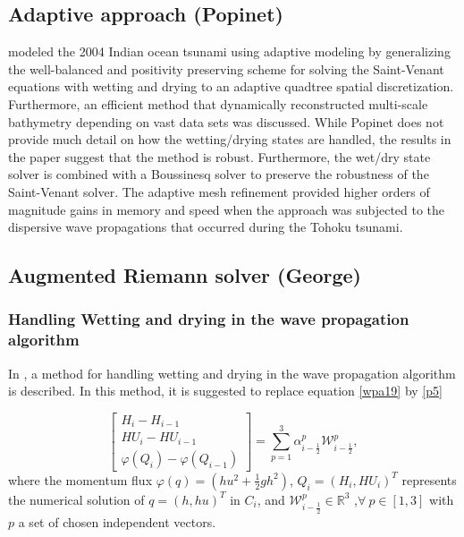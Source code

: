 \documentclass[10pt,a4paper]{article}
\begin{document}
	\subsection{Adaptive approach (Popinet)}
	\citet{popinet2011quadtree} modeled the 2004 Indian ocean tsunami using adaptive modeling by generalizing the   \citet{audusse2004fast} well-balanced and positivity preserving scheme for solving the Saint-Venant equations with wetting and drying to an adaptive quadtree spatial discretization.  Furthermore, an efficient method that dynamically reconstructed multi-scale bathymetry depending on vast data sets was discussed.  While Popinet does not provide much detail on how the wetting/drying states are handled, the results in the paper suggest that the method is robust.  Furthermore, the wet/dry state solver is combined with a Boussinesq solver to preserve the robustness of the Saint-Venant solver. The adaptive mesh refinement provided higher orders of magnitude gains in memory and speed when the approach was subjected to the dispersive wave propagations that occurred during the Tohoku tsunami.
	
	
	\subsection{Augmented Riemann solver (George)}
	
	\subsubsection{Handling Wetting and drying in the wave propagation algorithm}
	
	
	In  \citet{ge:2008,ge:2011}, a method for handling wetting and drying in the wave propagation algorithm is described.  In this method, it is suggested to replace  equation	\eqref{wpa19} by  \eqref{p5}
	
	
	\begin{equation}
		\begin{bmatrix} 
			H_{i} - H_{i-1}\\ 	HU_{i} - HU_{i-1} \\  \varphi(Q_{i}) - \varphi(Q_{i-1}) 
		\end{bmatrix} = \sum_{p=1}^{3} \alpha_{i-\frac{1}{2}}^{p} \mathcal{W}_{i-\frac{1}{2}}^{p},
		\label{p5}
	\end{equation}
	where the momentum flux $\varphi(q) = (hu^{2} + \frac{1}{2} gh^{2})$, $Q_{i} = (H_{i},HU_{i})^{T}$ represents the numerical solution of $q = (h,hu)^{T}$ in $C_{i}$, and $\mathcal{W}_{i-\frac{1}{2}}^{p} \in \mathbb{R}^{3}$ ,$\forall ~ p \in [1,3] $ with $p$ a set of chosen independent vectors. 
	
\end{document}
